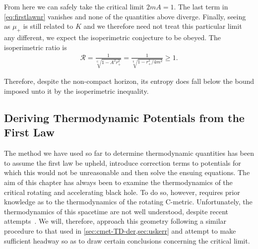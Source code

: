 \documentclass[
twoside,
openright,
frontopenright
]{dmathesis}
\begin{document}
From here we can safely take the critical limit $2mA = 1$. The last term in
\cref{eq:firstlawnr} vanishes and none of the quantities above diverge. Finally,
seeing as $\mu_+$ is still related to $K$ and we therefore need not treat this
particular limit any different, we expect the isoperimetric
conjecture to be obeyed. The isoperimetric ratio is
\begin{align}
\mathcal{R} =\frac{1}{\sqrt[6~]{1-A^2r_+^2}} =
  \frac{1}{\sqrt[6~]{1-r_+^2/4m^2}}\geqslant 1. 
\end{align}

Therefore, despite the non-compact horizon, its entropy does fall below the
bound imposed unto it by the isoperimetric inequality. 

\subsection{Deriving Thermodynamic Potentials from the First Law}

The method we have used so far to determine thermodynamic quantities has been to
assume the first law be upheld, introduce correction terms to potentials for
which this would not be unreasonable and then solve the ensuing equations. The
aim of this chapter has always been to examine the thermodynamics of the
critical rotating and accelerating black hole. To do so, however, requires prior
knowledge as to the thermodynamics of the rotating C-metric. Unfortunately, the
thermodynamics of this spacetime are not well understood, despite recent
attempts~\cite{Astorino:2016ybm}. We will, therefore, approach this geometry
following a similar procedure to that used in \cref{sec:cmet-TD-der,sec:uskerr}
and attempt to make sufficient headway so as to draw certain conclusions
concerning the critical limit.
\end{document}
